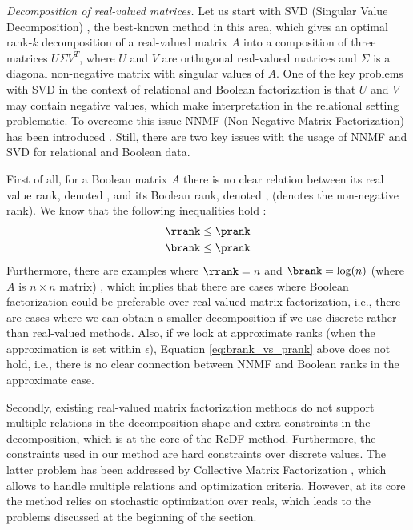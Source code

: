 \changesb
\textit{Decomposition of real-valued matrices.} Let us start with SVD (Singular Value Decomposition) \citep{matrix_book}, the best-known method in this area, which gives an optimal rank-$k$ decomposition of a real-valued matrix $A$ into a composition of three matrices $U \Sigma V^T$, where $U$ and $V$ are orthogonal real-valued matrices and $\Sigma$ is a diagonal non-negative matrix with singular values of $A$. One of the key problems with SVD in the context of relational and Boolean factorization is that $U$ and $V$ may contain negative values, which make interpretation in the relational setting problematic. To overcome this issue NNMF (Non-Negative Matrix Factorization) has been introduced \citep{nnmf}. Still, there are two key issues with the usage of NNMF and SVD for relational and Boolean data.

First of all, for a Boolean matrix $A$ there is no clear relation between its real value rank, denoted \rrank, and its Boolean rank, denoted \brank, (\prank denotes the non-negative rank). We know that the following inequalities hold \citep{phd_miettinen}:
  \begin{align}
    &\rrank \leq \prank \nonumber \\
    &\brank \leq \prank \label{eq:brank_vs_prank}
  \end{align}
Furthermore, there are examples where $\rrank = n$ and $\brank = \log(n)$ (where $A$ is $n \times n$ matrix) \citep{phd_miettinen}, which implies that there are cases where Boolean factorization could be preferable over real-valued matrix factorization, i.e., there are cases where we can obtain a smaller decomposition if we use discrete rather than real-valued methods. Also, if we look at approximate ranks (when the approximation is set within $\epsilon$), Equation \ref{eq:brank_vs_prank} above does not hold, i.e., there is no clear connection between NNMF and Boolean ranks in the approximate case.

Secondly, existing real-valued matrix factorization methods do not support multiple relations in the decomposition shape and extra constraints in the decomposition, which is at the core of the ReDF method. Furthermore, the constraints used in our method are hard constraints over discrete values.
The latter problem has been addressed by Collective Matrix Factorization \citep{collective_factorization}, which allows to handle multiple relations and optimization criteria. However, at its core the method relies on stochastic optimization over reals, which leads to the problems discussed at the beginning of the section.

